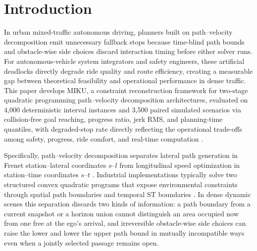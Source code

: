 \section{Introduction}
\label{sec:introduction}

In urban mixed-traffic autonomous driving, planners built on path--velocity decomposition emit unnecessary fallback stops because time-blind path bounds and obstacle-wise side choices discard interaction timing before either solver runs. For autonomous-vehicle system integrators and safety engineers, these artificial deadlocks directly degrade ride quality and route efficiency, creating a measurable gap between theoretical feasibility and operational performance in dense traffic. This paper develops MIKU, a constraint reconstruction framework for two-stage quadratic programming path--velocity decomposition architectures, evaluated on 4,000 deterministic interval instances and 3,500 paired simulated scenarios via collision-free goal reaching, progress ratio, jerk RMS, and planning-time quantiles, with degraded-stop rate directly reflecting the operational trade-offs among safety, progress, ride comfort, and real-time computation \citep{gonzalez2016,paden2016,schwarting2018planning}.

Specifically, path--velocity decomposition separates lateral path generation in Frenet station--lateral coordinates $s$--$l$ from longitudinal speed optimization in station--time coordinates $s$--$t$ \citep{kant1986pvd,werling2010,zhou2021dliaps}. Industrial implementations typically solve two structured convex quadratic programs that expose environmental constraints through spatial path boundaries and temporal ST boundaries \citep{fan2018baidu,zhang2020pathqp,wang2022_jfr}. In dense dynamic scenes this separation discards two kinds of information: a path boundary from a current snapshot or a horizon union cannot distinguish an area occupied now from one free at the ego's arrival, and irreversible obstacle-wise side choices can raise the lower and lower the upper path bound in mutually incompatible ways even when a jointly selected passage remains open.

